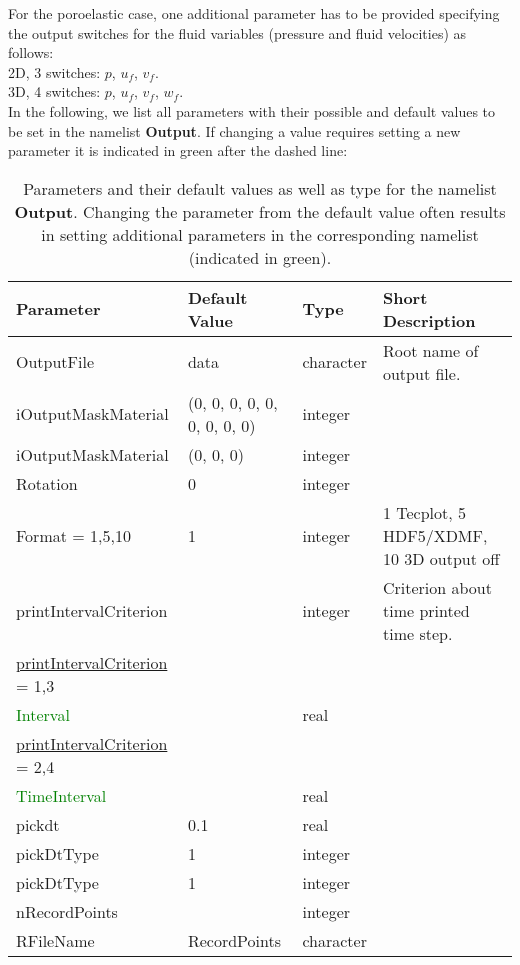\documentclass[12pt,twoside]{article}
\begin{document}
\noindent
For the poroelastic case, one additional parameter has to be provided specifying the output switches for the fluid variables 
(pressure and fluid velocities) as follows:\\
2D, 3 switches: $p$, $u_f$, $v_f$.\\
3D, 4 switches: $p$, $u_f$, $v_f$, $w_f$.\\

In the following, we list all parameters with their possible and default values to be set in the namelist \textbf{Output}.
If changing a value requires setting a new parameter it is indicated in green after the dashed line:\\

\begin{table}[H]
\caption{Parameters and their default values as well as type for the namelist \textbf{Output}.
         Changing the parameter from the default value often results in setting additional parameters 
         in the corresponding namelist (indicated in green).}
\begin{center}
\begin{tabular}{|p{4cm}|p{2.7cm}|p{2cm}|p{4cm}|}
\hline
Parameter & Default Value & Type & Short Description \\
\hline
\hline
OutputFile & data & character & Root name of output file. \\
iOutputMaskMaterial & (0, 0, 0, 0, 0, 0, 0, 0, 0) & integer & \\
iOutputMaskMaterial & (0, 0, 0) & integer & \\
Rotation & 0 & integer & \\
Format = 1,5,10 & 1 & integer & 1 Tecplot, 5 HDF5/XDMF, 10 3D output off \\
printIntervalCriterion &  & integer & Criterion about time printed time step.\\
\hdashline
\uline{printIntervalCriterion} = 1,3 & & & \\
\textcolor{green}{Interval} & & real & \\
\hdashline
\uline{printIntervalCriterion} = 2,4 & & & \\
\textcolor{green}{TimeInterval} & & real & \\
\hline
pickdt & 0.1 & real & \\
pickDtType & 1 & integer & \\
pickDtType & 1 & integer & \\
nRecordPoints & & integer & \\
RFileName & RecordPoints & character & \\

\end{tabular}
\end{center}
\end{table}
\end{document}

